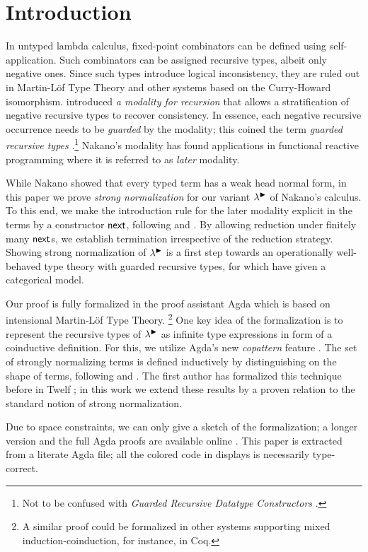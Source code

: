
\section{Introduction}
\label{sec:intro}

In untyped lambda calculus, fixed-point combinators can be defined
using self-app\-li\-ca\-tion.  Such combinators can be assigned recursive
types, albeit only negative ones.  Since such types introduce logical
inconsistency, they are ruled out in Martin-L\"of
Type Theory and other systems based on the Curry-Howard isomorphism.
\citet{nakano:lics00} introduced \emph{a modality for recursion} that
allows a stratification of negative recursive types to recover
consistency.  In essence, each negative recursive occurrence needs to
be \emph{guarded} by the modality; this coined the term \emph{guarded
  recursive types} \citep{birkedalMogelberg:lics13}.\footnote{Not to
  be confused with \emph{Guarded Recursive Datatype Constructors}
  \citep{xiChenChen:popl03}.}
Nakano's modality has found applications in functional reactive
programming \citep{krishnaswamiBenton:lics11} where it is referred to
as \emph{later} modality.

While Nakano showed that every typed term has a weak head normal form,
in this paper we prove \emph{strong normalization} for our variant
$\lambda^{\mathord{\blacktriangleright}}$ of Nakano's calculus.
To this end, we
make the introduction rule for the later modality explicit in the
terms by a constructor $\mathsf{next}$, following
\citet{birkedalMogelberg:lics13} and \citet{atkeyMcBride:icfp13}.  By
allowing reduction under finitely many $\mathsf{next}$s, we establish
termination irrespective of the reduction strategy.
%
Showing strong normalization of $\lambda^{\mathord{\blacktriangleright}}$ is a first step towards
an operationally well-behaved type theory with guarded recursive types, for
which \citet{birkedalMogelberg:lics13} have given a categorical model.

Our proof is fully formalized in the proof assistant Agda
\citeyearpar{agda24} which is based on intensional Martin-L\"of Type
Theory. \footnote{A similar proof could be formalized in other systems
  supporting mixed induction-coinduction, for instance, in Coq.}
One key idea of the formalization is to represent the recursive types
of $\lambda^{\mathord{\blacktriangleright}}$ as infinite type expressions in form of a
coinductive definition.  For this, we utilize Agda's new
\emph{copattern} feature \citep{abelPientkaThibodeauSetzer:popl13}.
The set of strongly normalizing terms is defined inductively by
distinguishing on the shape of terms, following
\citet{raamsdonk:perpetualReductions} and \citet{matthes:shortproofs}.  The first author has
formalized this technique before in Twelf \citep{abel:entcs04};
in this work we extend these results by a
proven relation to the standard notion of strong normalization.

Due to space constraints, we can only give a sketch of the
formalization; a longer version and
the full Agda proofs
are available online
\citep{abelVezzosi:guardedNormalization}.
This paper is extracted from a literate Agda file; all the colored
code in displays is necessarily type-correct.

